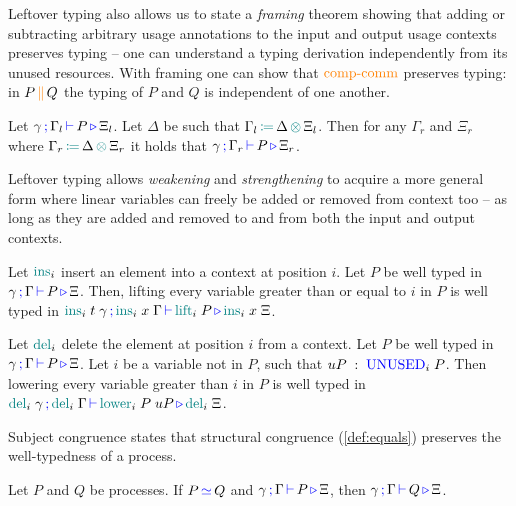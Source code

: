 \documentclass[runningheads]{llncs}
\newcommand{\type}[1]{\textcolor{blue}{\operatorname{#1}}}
\newcommand{\constr}[1]{\textcolor{orange}{\operatorname{#1}}}
\newcommand{\func}[1]{\textcolor{teal}{\operatorname{#1}}}
\newcommand{\comp}[2]{#1 \, \constr{\parallel} \, #2}
\newcommand{\opctx}[3]{#1 \, \func{\coloneqq} \, #2 \, \func{\otimes} \, #3}
\newcommand{\types}[4]{#1 \, \type{;} \, #2 \, \type{\vdash} \, #3 \, \type{\triangleright} \, #4}
\newcommand{\Unused}{\type{UNUSED}}
\newcommand{\eq}{\, \type{\simeq} \,}
\begin{document}
Leftover typing also allows us to state a \emph{framing} theorem showing that adding or subtracting arbitrary usage annotations to the input and output usage contexts preserves typing -- one can understand a typing derivation independently from its unused resources.
With framing one can show that $\constr{comp-comm}$ preserves typing: in $\comp{P}{Q}$ the typing of $P$ and $Q$ is independent of one another.
\begin{nitheorem}[Framing]
  \label{thm:framing}
  Let $\types{\gamma}{\Gamma_l}{P}{\Xi_l}$.
  Let $\Delta$ be such that $\opctx{\Gamma_l}{\Delta}{\Xi_l}$.
  Then for any $\Gamma_r$ and $\Xi_r$ where $\opctx{\Gamma_r}{\Delta}{\Xi_r}$ it holds that $\types{\gamma}{\Gamma_r}{P}{\Xi_r}$.
\end{nitheorem}

Leftover typing allows \emph{weakening} and \emph{strengthening} to acquire a more general form where linear variables can freely be added or removed from context too -- as long as they are added and removed to and from both the input and output contexts.

\begin{nitheorem}[Weakening]
  \label{thm:weakening}
  Let $\func{ins}_i$ insert an element into a context at position $i$.
  Let $P$ be well typed in $\types{\gamma}{\Gamma}{P}{\Xi}$.
  Then, lifting every variable greater than or equal to $i$ in $P$ is well typed in
  $\types{\func{ins}_i \; t \; \gamma}{\func{ins}_i \; x \; \Gamma}{\func{lift}_i \; P}{\func{ins}_i \; x \; \Xi}$.
\end{nitheorem}

\begin{nitheorem}[Strengthening]
  \label{thm:strengthening} 
  Let $\func{del}_i$ delete the element at position $i$ from a context.
  Let $P$ be well typed in $\types{\gamma}{\Gamma}{P}{\Xi}$.
  Let $i$ be a variable not in $P$, such that $uP \; : \; \Unused_i \; P$.
  Then lowering every variable greater than $i$ in $P$ is well typed in $\types{\func{del}_i \; \gamma}{\func{del}_i \; \Gamma}{\func{lower}_i \; P \; uP}{\func{del}_i \; \Xi}$.
\end{nitheorem}

Subject congruence states that structural congruence (\autoref{def:equals}) preserves the well-typedness of a process.
\begin{nitheorem}
  \label{thm:subject-congruence}
  Let $P$ and $Q$ be processes. If $P \eq{} Q$ and $\types{\gamma}{\Gamma}{P}{\Xi}$, then $\types{\gamma}{\Gamma}{Q}{\Xi}$.
\end{nitheorem}
\end{document}
